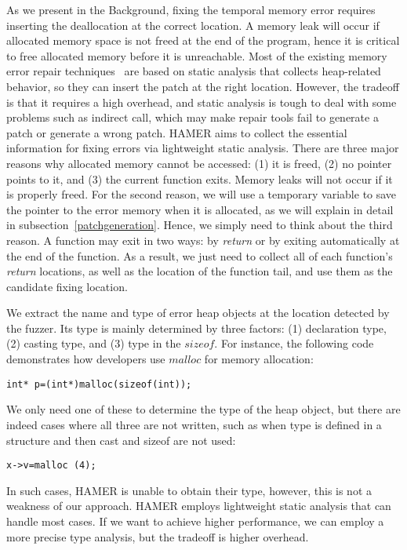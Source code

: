 \documentclass[a4paper,11pt,oneside,openany]{book}
\begin{document}
As we present in the Background, fixing the temporal memory error requires inserting the deallocation at the correct location. A memory leak will occur if allocated memory space is not freed at the end of the program, hence it is critical to free allocated memory before it is unreachable. Most of the existing memory error repair techniques~\cite{SAVER, Memfix} are based on static analysis that collects heap-related behavior, so they can insert the patch at the right location. However, the tradeoff is that it requires a high overhead, and static analysis is tough to deal with some problems such as indirect call, which may make repair tools fail to generate a patch or generate a wrong patch. HAMER aims to collect the essential information for fixing errors via lightweight static analysis. There are three major reasons why allocated memory cannot be accessed: (1) it is freed, (2) no pointer points to it, and (3) the current function exits. Memory leaks will not occur if it is properly freed. For the second reason, we will use a temporary variable to save the pointer to the error memory when it is allocated, as we will explain in detail in subsection~\ref{patchgeneration}. Hence,  we simply need to think about the third reason. A function may exit in two ways: by {\it return} or by exiting automatically at the end of the function. As a result, we just need to collect all of each function's {\it return} locations, as well as the location of the function tail, and use them as the candidate fixing location.



We extract the name and type of error heap objects at the location detected by the fuzzer. Its type is mainly determined by three factors: (1) declaration type, (2) casting type, and (3) type in the $sizeof$. For instance, the following code demonstrates how developers use $malloc$ for memory allocation:


\begin{minipage}{\textwidth}
\vspace{0.2cm}
\hspace{0.3cm}\verb|int* p=(int*)malloc(sizeof(int));|
\vspace{0.2cm}
\end{minipage}
We only need one of these to determine the type of the heap object, but there are indeed cases where all three are not written, such as when type is defined in a structure and then cast and sizeof are not used:


\begin{minipage}{\textwidth}
\vspace{0.2cm}
\hspace{0.3cm}\verb|x->v=malloc (4);|
\vspace{0.2cm}
\end{minipage}
In such cases, HAMER is unable to obtain their type, however, this is not a weakness of our approach. HAMER employs lightweight static analysis that can handle most cases. If we want to achieve higher performance, we can employ a more precise type analysis, but the tradeoff is higher overhead.
\end{document}
